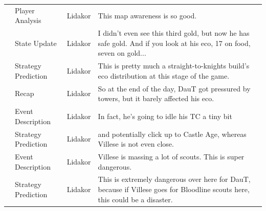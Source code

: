 {\begin{longtable}{@{}>{\theAppRow}r|L{2.3cm}L{1.0cm}U{11.55cm}@{}}
    & Player Analysis       & Lidakor & This map awareness is so good.                                                                                                                                                                                                                                                                  \\
    & State Update          & Lidakor & I didn't even see this third gold, but now he has safe gold. And if you look at his eco, 17 on food, seven on gold...                                                                                                                                                                           \\
    & Strategy Prediction   & Lidakor & This is pretty much a straight-to-knights build's eco distribution at this stage of the game.                                                                                                                                                                                                   \\
    & Recap                 & Lidakor & So at the end of the day, DauT got pressured by towers, but it barely affected his eco.                                                                                                                                                                                                         \\
    & Event Description     & Lidakor & In fact, he's going to idle his TC a tiny bit                                                                                                                                                                                                                                                   \\
    & Strategy Prediction   & Lidakor & and potentially click up to Castle Age, whereas Villese is not even close.                                                                                                                                                                                                                      \\
    & Event Description     & Lidakor & Villese is massing a lot of scouts. This is super dangerous.                                                                                                                                                                                                                                    \\
    & Strategy Prediction   & Lidakor & This is extremely dangerous over here for DauT, because if Villese goes for Bloodline scouts here, this could be a disaster.                                                                                                                                                                    \\

\end{longtable}}
